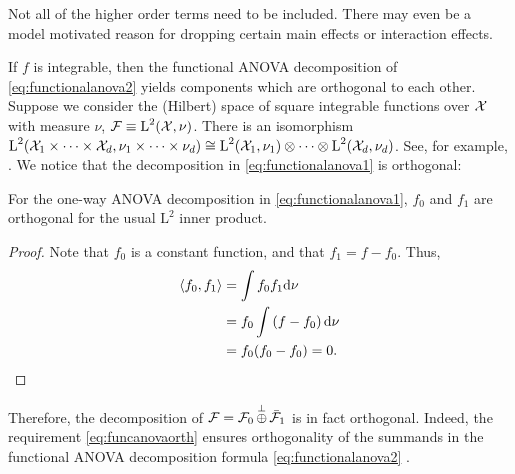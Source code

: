 
\begin{remark}
  Not all of the higher order terms need to be included. There may even be a model motivated reason for dropping certain main effects or interaction effects.  
\end{remark}

\begin{remark}
If $f$ is integrable, then the functional ANOVA decomposition of \cref{eq:functionalanova2} yields components which are orthogonal to each other.
Suppose we consider the (Hilbert) space of square integrable functions over ${\mathcal X}$ with measure $\nu$, ${\mathcal F} \equiv \text{L}^2({\mathcal X},\nu)$.
There is an isomorphism $\text{L}^2({\mathcal X}_1\times\cdots\times{\mathcal X}_d,\nu_1\times\cdots\times\nu_d) \cong \text{L}^2({\mathcal X}_1,\nu_1) \otimes \cdots \otimes \text{L}^2({\mathcal X}_d,\nu_d)$. 
See, for example, \citet{reed1972methods,kree1974produits}.
We notice that the decomposition in \cref{eq:functionalanova1} is orthogonal:

\begin{claim}
  For the one-way ANOVA decomposition in \cref{eq:functionalanova1}, $f_0$ and $f_1$ are orthogonal for the usual $\text{L}^2$ inner product.
\end{claim}

\begin{proof}
  Note that $f_0$ is a constant function, and that $f_1 = f- f_0$.
  Thus,
  \begin{align*}
    \langle f_0,f_1\rangle 
    &= \int f_0f_1 \text{d}\nu \\
    &= f_0 \int \left(f - f_0\right) \text{d}\nu \\
    &= f_0 (f_0 - f_0) = 0. \qedhere
  \end{align*}
\end{proof}

Therefore, the decomposition of ${\mathcal F} = {\mathcal F}_0 \displaystyle\mathop{\oplus}^\bot \bar{{\mathcal F}}_1$ is in fact orthogonal. 
Indeed, the requirement \cref{eq:funcanovaorth} ensures orthogonality of the summands in the functional ANOVA decomposition formula \cref{eq:functionalanova2} \citep[Definition 1]{sobol2001global}.  
\end{remark}

